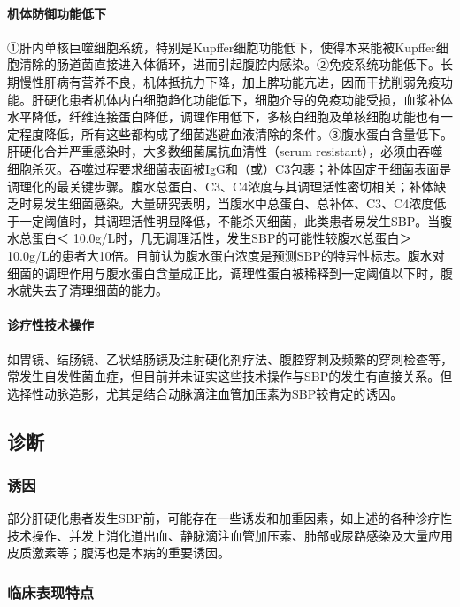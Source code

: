 \paragraph{机体防御功能低下}

①肝内单核巨噬细胞系统，特别是Kupffer细胞功能低下，使得本来能被Kupffer细胞清除的肠道菌直接进入体循环，进而引起腹腔内感染。②免疫系统功能低下。长期慢性肝病有营养不良，机体抵抗力下降，加上脾功能亢进，因而干扰削弱免疫功能。肝硬化患者机体内白细胞趋化功能低下，细胞介导的免疫功能受损，血浆补体水平降低，纤维连接蛋白降低，调理作用低下，多核白细胞及单核细胞功能也有一定程度降低，所有这些都构成了细菌逃避血液清除的条件。③腹水蛋白含量低下。肝硬化合并严重感染时，大多数细菌属抗血清性（serum
resistant），必须由吞噬细胞杀灭。吞噬过程要求细菌表面被IgG和（或）C3包裹；补体固定于细菌表面是调理化的最关键步骤。腹水总蛋白、C3、C4浓度与其调理活性密切相关；补体缺乏时易发生细菌感染。大量研究表明，当腹水中总蛋白、总补体、C3、C4浓度低于一定阈值时，其调理活性明显降低，不能杀灭细菌，此类患者易发生SBP。当腹水总蛋白＜
10.0g/L时，几无调理活性，发生SBP的可能性较腹水总蛋白＞
10.0g/L的患者大10倍。目前认为腹水蛋白浓度是预测SBP的特异性标志。腹水对细菌的调理作用与腹水蛋白含量成正比，调理性蛋白被稀释到一定阈值以下时，腹水就失去了清理细菌的能力。

\paragraph{诊疗性技术操作}

如胃镜、结肠镜、乙状结肠镜及注射硬化剂疗法、腹腔穿刺及频繁的穿刺检查等，常发生自发性菌血症，但目前并未证实这些技术操作与SBP的发生有直接关系。但选择性动脉造影，尤其是结合动脉滴注血管加压素为SBP较肯定的诱因。

\subsection{诊断}

\subsubsection{诱因}

部分肝硬化患者发生SBP前，可能存在一些诱发和加重因素，如上述的各种诊疗性技术操作、并发上消化道出血、静脉滴注血管加压素、肺部或尿路感染及大量应用皮质激素等；腹泻也是本病的重要诱因。

\subsubsection{临床表现特点}

